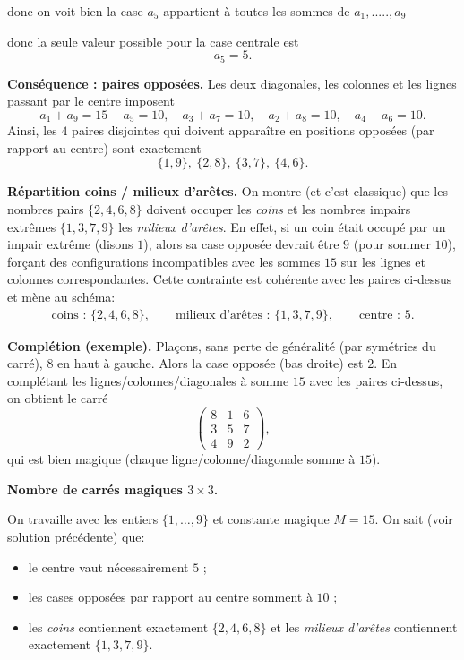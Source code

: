 donc on voit bien la case $a_5$ appartient à toutes les sommes de ${a_1 , ..... , a_9}$


donc la seule valeur possible pour la case centrale est
\[
a_5=5.
\]

\medskip
\noindent\textbf{Conséquence : paires opposées.}
Les deux diagonales, les colonnes et les lignes passant par le centre imposent
\[
a_1+a_9=15-a_5=10,\quad
a_3+a_7=10,\quad
a_2+a_8=10,\quad
a_4+a_6=10.
\]
Ainsi, les $4$ paires disjointes qui doivent apparaître en positions opposées (par rapport au centre) sont exactement
\[
\{1,9\},\ \{2,8\},\ \{3,7\},\ \{4,6\}.
\]

\medskip
\noindent\textbf{Répartition coins / milieux d’arêtes.}
On montre (et c’est classique) que les nombres pairs $\{2,4,6,8\}$ doivent occuper les \emph{coins} et les nombres impairs extrêmes $\{1,3,7,9\}$ les \emph{milieux d’arêtes}. 
En effet, si un coin était occupé par un impair extrême (disons $1$), alors sa case opposée devrait être $9$ (pour sommer $10$), forçant des configurations incompatibles avec les sommes \(15\) sur les lignes et colonnes correspondantes. 
Cette contrainte est cohérente avec les paires ci-dessus et mène au schéma:
\[
\begin{array}{c}
\text{coins : } \{2,4,6,8\},\qquad
\text{milieux d’arêtes : } \{1,3,7,9\},\qquad
\text{centre : } 5.
\end{array}
\]

\medskip
\noindent\textbf{Complétion (exemple).}
Plaçons, sans perte de généralité (par symétries du carré), $8$ en haut à gauche. 
Alors la case opposée (bas droite) est $2$. 
En complétant les lignes/colonnes/diagonales à somme $15$ avec les paires ci-dessus, on obtient le carré 
\[
\begin{pmatrix}
8 & 1 & 6 \\
3 & 5 & 7 \\
4 & 9 & 2
\end{pmatrix},
\]
qui est bien magique (chaque ligne/colonne/diagonale somme à $15$).

\medskip
\noindent\textbf{Nombre de carrés magiques $3\times 3$.}

On travaille avec les entiers $\{1,\dots,9\}$ et constante magique $M=15$. On sait (voir solution précédente) que:
\begin{itemize}
  \item le centre vaut nécessairement $5$ ;
  \item les cases opposées par rapport au centre somment à $10$ ;
  \item les \emph{coins} contiennent exactement $\{2,4,6,8\}$ et les \emph{milieux d’arêtes} contiennent exactement $\{1,3,7,9\}$.
\end{itemize}

